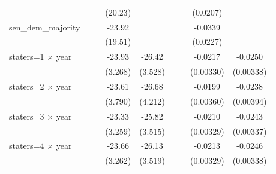 {\begin{longtable}{l*{8}{c}}
                    &                     &                     &     (20.23)         &                     &                     &                     &    (0.0207)         &                     \\
[1em]
sen\_dem\_majority    &                     &                     &      -23.92         &                     &                     &                     &     -0.0339         &                     \\
                    &                     &                     &     (19.51)         &                     &                     &                     &    (0.0227)         &                     \\
[1em]
staters=1 $\times$ year&                     &                     &      -23.93\sym{***}&      -26.42\sym{***}&                     &                     &     -0.0217\sym{***}&     -0.0250\sym{***}\\
                    &                     &                     &     (3.268)         &     (3.528)         &                     &                     &   (0.00330)         &   (0.00338)         \\
[1em]
staters=2 $\times$ year&                     &                     &      -23.61\sym{***}&      -26.68\sym{***}&                     &                     &     -0.0199\sym{***}&     -0.0238\sym{***}\\
                    &                     &                     &     (3.790)         &     (4.212)         &                     &                     &   (0.00360)         &   (0.00394)         \\
[1em]
staters=3 $\times$ year&                     &                     &      -23.33\sym{***}&      -25.82\sym{***}&                     &                     &     -0.0210\sym{***}&     -0.0243\sym{***}\\
                    &                     &                     &     (3.259)         &     (3.515)         &                     &                     &   (0.00329)         &   (0.00337)         \\
[1em]
staters=4 $\times$ year&                     &                     &      -23.66\sym{***}&      -26.13\sym{***}&                     &                     &     -0.0213\sym{***}&     -0.0246\sym{***}\\
                    &                     &                     &     (3.262)         &     (3.519)         &                     &                     &   (0.00329)         &   (0.00338)         \\

\end{longtable}}
